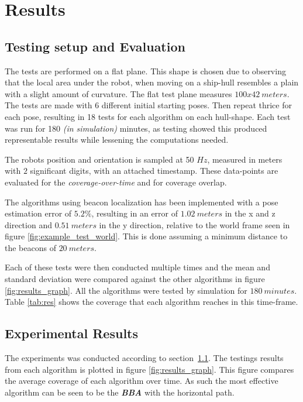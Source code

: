 \section{Results}
\subsection{Testing setup and Evaluation}\label{testing_setup}

The tests are performed on a flat plane. This shape is chosen due to observing that the local area under the robot, when moving on a ship-hull resembles a plain with a slight amount of curvature. The flat test plane measures $100x42~meters$. 
The tests are made with 6 different initial starting poses. Then repeat thrice for each pose, resulting in 18 tests for each algorithm on each hull-shape. Each test was run for 180 \textit{(in simulation)} minutes, as testing showed this produced representable results while lessening the computations needed.

The robots position and orientation is sampled at 50 $Hz$, measured in meters with $2$ significant digits, with an attached timestamp. These data-points are evaluated for the \textit{coverage-over-time} and for coverage overlap.

The algorithms using beacon localization has been implemented with a pose estimation error of $5.2\%$, resulting in an error of $1.02~meters$ in the x and z direction and $0.51~meters$ in the y direction, relative to the world frame seen in figure \ref{fig:example_test_world}. This is done  assuming a minimum distance to the beacons of $20~meters$.\cite{beacon_error}

Each of these tests were then conducted multiple times and the mean and standard deviation were compared against the other algorithms in figure \ref{fig:results_graph}.
All the algorithms were tested by simulation for $180~minutes$. Table \ref{tab:res} shows the coverage that each algorithm reaches in this time-frame.
\subsection{Experimental Results}
The experiments was conducted according to section~\ref{testing_setup}.
The testings results from each algorithm is plotted in figure \ref{fig:results_graph}. This figure compares the average coverage of each algorithm over time. As such the most effective algorithm can be seen to be the \textit{\textbf{BBA}} with the horizontal path.

